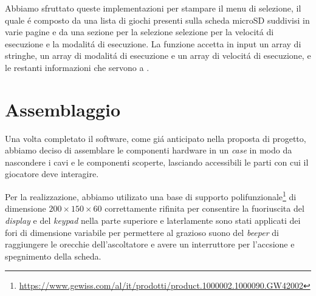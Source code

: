 \documentclass[a4paper]{article}
\begin{document}
Abbiamo sfruttato queste implementazioni per stampare il menu di selezione, il quale é composto da una lista di giochi presenti sulla scheda microSD suddivisi in varie pagine e da una sezione per la selezione selezione per la velocitá di esecuzione e la modalitá di esecuzione. La funzione accetta in input un array di stringhe, un array di modalitá di esecuzione e un array di velocitá di esecuzione, e le restanti informazioni che servono a {}.

\section{Assemblaggio}

Una volta completato il software, come gi\'a anticipato nella proposta di progetto, abbiamo deciso di assemblare le componenti hardware in un \textit{case} in modo da nascondere i cavi e le componenti scoperte, lasciando accessibili le parti con cui il giocatore deve interagire.

Per la realizzazione, abbiamo utilizato una base di supporto polifunzionale\footnote{\url{https://www.gewiss.com/al/it/prodotti/product.1000002.1000090.GW42002}} di dimensione $200 \times 150 \times 60$ correttamente rifinita per consentire la fuoriuscita del \textit{display} e del \textit{keypad} nella parte superiore e laterlamente sono stati applicati dei fori di dimensione variabile per permettere al grazioso suono del \textit{beeper} di raggiungere le orecchie dell'ascoltatore e avere un interruttore per l'accsione e spegnimento della scheda.
\end{document}
